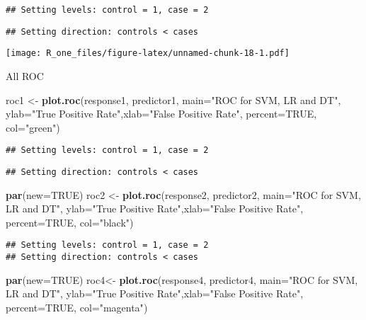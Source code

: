\documentclass[]{article}
\newenvironment{Shaded}{\begin{snugshade}}{\end{snugshade}}
\newcommand{\DataTypeTok}[1]{\textcolor[rgb]{0.13,0.29,0.53}{#1}}
\newcommand{\KeywordTok}[1]{\textcolor[rgb]{0.13,0.29,0.53}{\textbf{#1}}}
\newcommand{\NormalTok}[1]{#1}
\newcommand{\OtherTok}[1]{\textcolor[rgb]{0.56,0.35,0.01}{#1}}
\newcommand{\StringTok}[1]{\textcolor[rgb]{0.31,0.60,0.02}{#1}}
\begin{document}
\begin{verbatim}
## Setting levels: control = 1, case = 2
\end{verbatim}

\begin{verbatim}
## Setting direction: controls < cases
\end{verbatim}

\texttt{[image: R\_one\_files/figure-latex/unnamed-chunk-18-1.pdf]}

All ROC

\begin{Shaded}
\begin{Highlighting}[]
\NormalTok{roc1 <-}\StringTok{ }\KeywordTok{plot.roc}\NormalTok{(response1, predictor1,  }\DataTypeTok{main=}\StringTok{"ROC for SVM, LR and DT"}\NormalTok{,}
\DataTypeTok{ylab=}\StringTok{"True Positive Rate"}\NormalTok{,}\DataTypeTok{xlab=}\StringTok{"False Positive Rate"}\NormalTok{, }\DataTypeTok{percent=}\OtherTok{TRUE}\NormalTok{, }\DataTypeTok{col=}\StringTok{"green"}\NormalTok{) }
\end{Highlighting}
\end{Shaded}

\begin{verbatim}
## Setting levels: control = 1, case = 2
\end{verbatim}

\begin{verbatim}
## Setting direction: controls < cases
\end{verbatim}

\begin{Shaded}
\begin{Highlighting}[]
\KeywordTok{par}\NormalTok{(}\DataTypeTok{new=}\OtherTok{TRUE}\NormalTok{)}
\NormalTok{roc2 <-}\StringTok{ }\KeywordTok{plot.roc}\NormalTok{(response2, predictor2,  }\DataTypeTok{main=}\StringTok{"ROC for SVM, LR and DT"}\NormalTok{,}
                 \DataTypeTok{ylab=}\StringTok{"True Positive Rate"}\NormalTok{,}\DataTypeTok{xlab=}\StringTok{"False Positive Rate"}\NormalTok{, }\DataTypeTok{percent=}\OtherTok{TRUE}\NormalTok{, }\DataTypeTok{col=}\StringTok{"black"}\NormalTok{)}
\end{Highlighting}
\end{Shaded}

\begin{verbatim}
## Setting levels: control = 1, case = 2
## Setting direction: controls < cases
\end{verbatim}

\begin{Shaded}
\begin{Highlighting}[]
\KeywordTok{par}\NormalTok{(}\DataTypeTok{new=}\OtherTok{TRUE}\NormalTok{)}
\NormalTok{roc4<-}\StringTok{ }\KeywordTok{plot.roc}\NormalTok{(response4, predictor4,  }\DataTypeTok{main=}\StringTok{"ROC for SVM, LR and DT"}\NormalTok{,}
                \DataTypeTok{ylab=}\StringTok{"True Positive Rate"}\NormalTok{,}\DataTypeTok{xlab=}\StringTok{"False Positive Rate"}\NormalTok{, }\DataTypeTok{percent=}\OtherTok{TRUE}\NormalTok{, }\DataTypeTok{col=}\StringTok{"magenta"}\NormalTok{)}
\end{Highlighting}
\end{Shaded}
\end{document}
